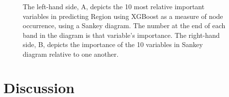 \documentclass[review,12pt,authoryear]{elsarticle}
\begin{document}
\begin{linenumbers}
\begin{figure}[htb]
  \caption{The left-hand side, A,  depicts the 10 most relative important variables in predicting Region using XGBoost as a measure of node occurrence, using a Sankey diagram. The number at the end of each band in the diagram is that variable's importance. The right-hand side, B, depicts the importance of the 10 variables in Sankey diagram relative to one another.}\label{fig:region_sankey}
 \end{figure}
\section{Discussion}


\end{linenumbers}
\end{document}
